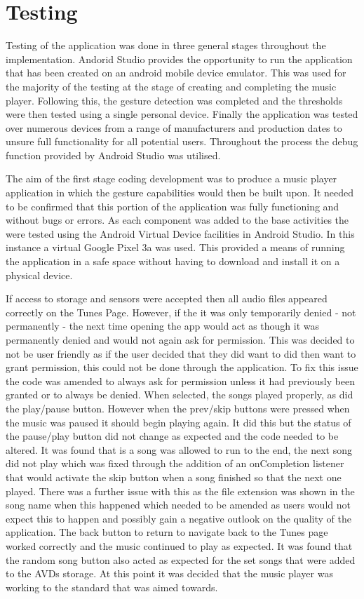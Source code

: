 \documentclass{l4proj}
\begin{document}
\section{Testing}

Testing of the application was done in three general stages throughout the implementation. Andorid Studio provides the opportunity to run the application that has been created on an android mobile device emulator. This was used for the majority of the testing at the stage of creating and completing the music player. Following this, the gesture detection was completed and the thresholds were then tested using a single personal device. Finally the application was tested over numerous devices from a range of manufacturers and production dates to unsure full functionality for all potential users. Throughout the process the debug function provided by Android Studio was utilised.

The aim of the first stage coding development was to produce a music player application in which the gesture capabilities would then be built upon. It needed to be confirmed that this portion of the application was fully functioning and without bugs or errors. As each component was added to the base activities the were tested using the Android Virtual Device facilities in Android Studio. In this instance a virtual Google Pixel 3a was used. This provided a means of running the application in a safe space without having to download and install it on a physical device. 

If access to storage and sensors were accepted then all audio files appeared correctly on the Tunes Page. However, if the it was only temporarily denied - not permanently - the next time opening the app would act as though it was permanently denied and would not again ask for permission. This was decided to not be user friendly as if the user decided that they did want to did then want to grant permission, this could not be done through the application. To fix this issue the code was amended to always ask for permission unless it had previously been granted or to always be denied. When selected, the songs played properly, as did the play/pause button. However when the prev/skip buttons were pressed when the music was paused it should begin playing again. It did this but the status of the pause/play button did not change as expected and the code needed to be altered. It was found that is a song was allowed to run to the end, the next song did not play which was fixed through the addition of an onCompletion listener that would activate the skip button when a song finished so that the next one played. There was a further issue with this as the file extension was shown in the song name when this happened which needed to be amended as users would not expect this to happen and possibly gain a negative outlook on the quality of the application. The back button to return to navigate back to the Tunes page worked correctly and the music continued to play as expected. It was found that the random song button also acted as expected for the set songs that were added to the AVDs storage. At this point it was decided that the music player was working to the standard that was aimed towards. 
\end{document}
